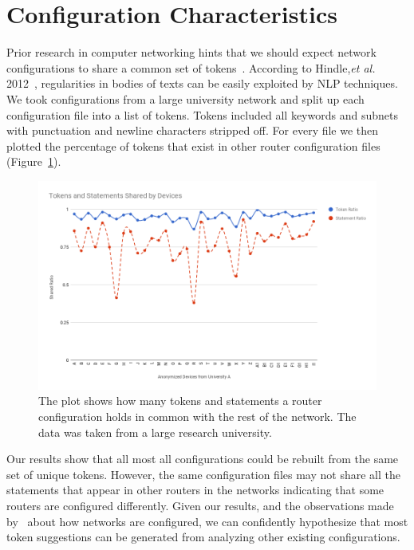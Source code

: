 \section{Configuration Characteristics}

Prior research in computer networking hints that we should expect network configurations to share a common set of tokens~\cite{compelxity}. According to Hindle,\textit{et al.} 2012~\cite{naturalness}, regularities in bodies of texts can be easily exploited by NLP techniques. We took configurations from a large university network and split up each configuration file into a list of tokens. Tokens included all keywords and subnets with punctuation and newline characters stripped off. For every file we then plotted the percentage of tokens that exist in other router configuration files (Figure~\ref{fig:chart}).\\

\begin{figure}
	\centering
	\includegraphics[width=\columnwidth]{chart.png}
	\caption{The plot shows how many tokens and statements a router configuration holds in common with the rest of the network. The data was taken from a large research university.}
    \label{fig:chart}
\end{figure}

Our results show that all most all configurations could be rebuilt from the same set of unique tokens. However, the same configuration files may not share all the statements that appear in other routers in the networks indicating that some routers are configured differently. Given our results, and the observations made by~\cite{complexity} about how networks are configured, we can confidently hypothesize that most token suggestions can be generated from analyzing other existing configurations.\\


